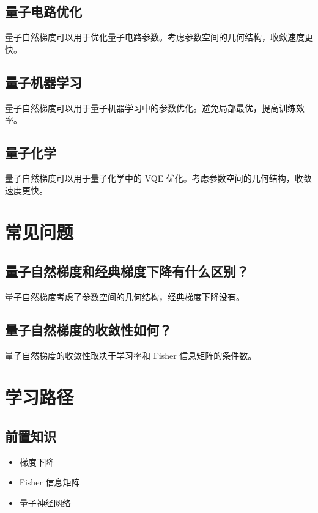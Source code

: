 \documentclass[12pt,a4paper]{article}
\begin{document}
\subsection{量子电路优化}

量子自然梯度可以用于优化量子电路参数。考虑参数空间的几何结构，收敛速度更快。

\subsection{量子机器学习}

量子自然梯度可以用于量子机器学习中的参数优化。避免局部最优，提高训练效率。

\subsection{量子化学}

量子自然梯度可以用于量子化学中的 VQE 优化。考虑参数空间的几何结构，收敛速度更快。

\section{常见问题}

\subsection{量子自然梯度和经典梯度下降有什么区别？}

量子自然梯度考虑了参数空间的几何结构，经典梯度下降没有。

\subsection{量子自然梯度的收敛性如何？}

量子自然梯度的收敛性取决于学习率和 Fisher 信息矩阵的条件数。

\section{学习路径}

\subsection{前置知识}
\begin{itemize}
  \item 梯度下降
  \item Fisher 信息矩阵
  \item 量子神经网络
\end{itemize}
\end{document}

